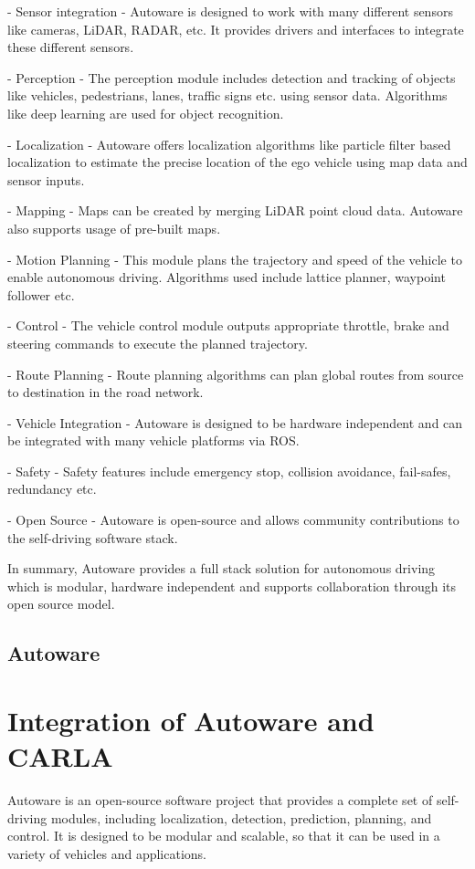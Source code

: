 - Sensor integration - Autoware is designed to work with many different sensors like cameras, LiDAR, RADAR, etc. It provides drivers and interfaces to integrate these different sensors.

- Perception - The perception module includes detection and tracking of objects like vehicles, pedestrians, lanes, traffic signs etc. using sensor data. Algorithms like deep learning are used for object recognition.

- Localization - Autoware offers localization algorithms like particle filter based localization to estimate the precise location of the ego vehicle using map data and sensor inputs.

- Mapping - Maps can be created by merging LiDAR point cloud data. Autoware also supports usage of pre-built maps.

- Motion Planning - This module plans the trajectory and speed of the vehicle to enable autonomous driving. Algorithms used include lattice planner, waypoint follower etc. 

- Control - The vehicle control module outputs appropriate throttle, brake and steering commands to execute the planned trajectory. 

- Route Planning - Route planning algorithms can plan global routes from source to destination in the road network.

- Vehicle Integration - Autoware is designed to be hardware independent and can be integrated with many vehicle platforms via ROS.

- Safety - Safety features include emergency stop, collision avoidance, fail-safes, redundancy etc.

- Open Source - Autoware is open-source and allows community contributions to the self-driving software stack.

In summary, Autoware provides a full stack solution for autonomous driving which is modular, hardware independent and supports collaboration through its open source model.


\subsection{Autoware}

\section{Integration of Autoware and CARLA}

Autoware is an open-source software project that provides a complete set of self-driving modules, including localization, detection, prediction, planning, and control. It is designed to be modular and scalable, so that it can be used in a variety of vehicles and applications.

